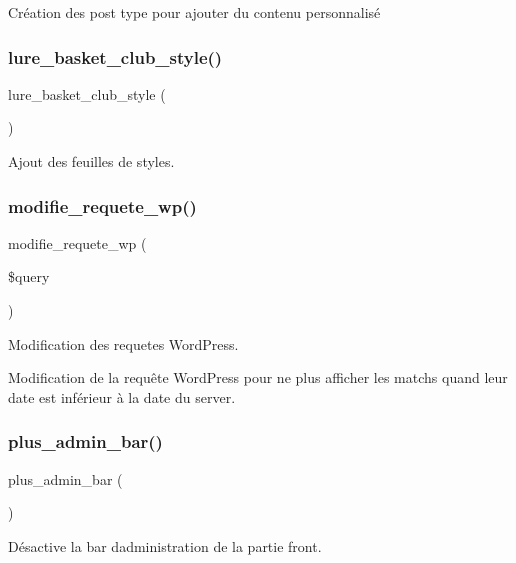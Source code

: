 Création des post type pour ajouter du contenu personnalisé 

\hypertarget{functions_8php_acab88b98993dd5d04296218f6bb5ed36}{}\label{functions_8php_acab88b98993dd5d04296218f6bb5ed36} 
\subsubsection{\texorpdfstring{lure\+\_\+basket\+\_\+club\+\_\+style()}{lure\_basket\_club\_style()}}
{\footnotesize\ttfamily lure\+\_\+basket\+\_\+club\+\_\+style (\begin{DoxyParamCaption}{ }\end{DoxyParamCaption})}



Ajout des feuilles de styles. 

\hypertarget{functions_8php_a23af4c955cb3f46b3b1e0e0f3748da6a}{}\label{functions_8php_a23af4c955cb3f46b3b1e0e0f3748da6a} 
\subsubsection{\texorpdfstring{modifie\+\_\+requete\+\_\+wp()}{modifie\_requete\_wp()}}
{\footnotesize\ttfamily modifie\+\_\+requete\+\_\+wp (\begin{DoxyParamCaption}\item[{}]{\$query }\end{DoxyParamCaption})}



Modification des requetes Word\+Press. 

Modification de la requête Word\+Press pour ne plus afficher les matchs quand leur date est inférieur à la date du server. \hypertarget{functions_8php_abc0237fdc1b4f1a45f7c02c88eccc682}{}\label{functions_8php_abc0237fdc1b4f1a45f7c02c88eccc682} 
\subsubsection{\texorpdfstring{plus\+\_\+admin\+\_\+bar()}{plus\_admin\_bar()}}
{\footnotesize\ttfamily plus\+\_\+admin\+\_\+bar (\begin{DoxyParamCaption}{ }\end{DoxyParamCaption})}



Désactive la bar d\textquotesingle{}administration de la partie front. 

